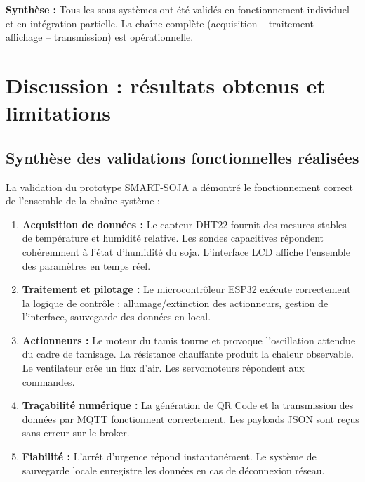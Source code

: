 \textbf{Synthèse :} Tous les sous-systèmes ont été validés en fonctionnement individuel et en intégration partielle. La chaîne complète (acquisition -- traitement -- affichage -- transmission) est opérationnelle.

\section{Discussion : résultats obtenus et limitations}

\subsection{Synthèse des validations fonctionnelles réalisées}

La validation du prototype SMART-SOJA a démontré le fonctionnement correct de l'ensemble de la chaîne système :

\begin{enumerate}
    \item \textbf{Acquisition de données :} Le capteur DHT22 fournit des mesures stables de température et humidité relative. Les sondes capacitives répondent cohéremment à l'état d'humidité du soja. L'interface LCD affiche l'ensemble des paramètres en temps réel.
    
    \item \textbf{Traitement et pilotage :} Le microcontrôleur ESP32 exécute correctement la logique de contrôle : allumage/extinction des actionneurs, gestion de l'interface, sauvegarde des données en local.
    
    \item \textbf{Actionneurs :} Le moteur du tamis tourne et provoque l'oscillation attendue du cadre de tamisage. La résistance chauffante produit la chaleur observable. Le ventilateur crée un flux d'air. Les servomoteurs répondent aux commandes.
    
    \item \textbf{Traçabilité numérique :} La génération de QR Code et la transmission des données par MQTT fonctionnent correctement. Les payloads JSON sont reçus sans erreur sur le broker.
    
    \item \textbf{Fiabilité :} L'arrêt d'urgence répond instantanément. Le système de sauvegarde locale enregistre les données en cas de déconnexion réseau.
\end{enumerate}

